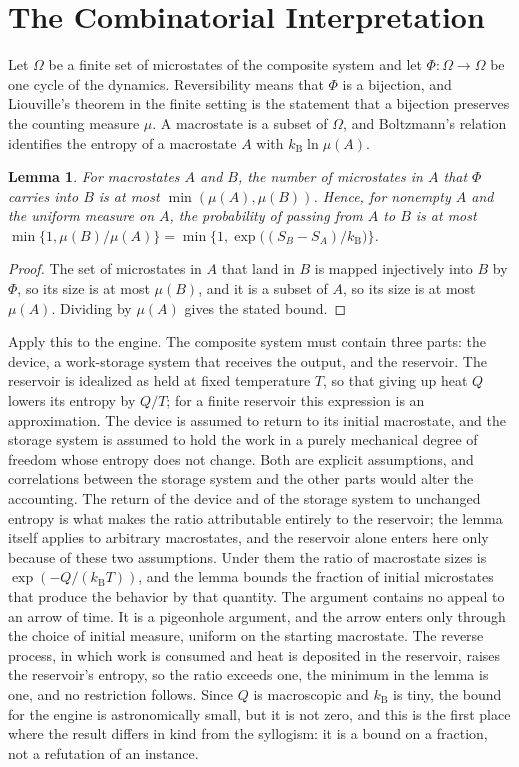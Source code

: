 \documentclass[11pt]{article}
\newtheorem{lemma}{Lemma}
\theoremstyle{definition}
\theoremstyle{remark}
\newcommand{\kB}{k_{\mathrm B}}
\begin{document}
\section{The Combinatorial Interpretation}\label{sec:comb}

Let $\Omega$ be a finite set of microstates of the composite system and let $\Phi : \Omega \to \Omega$ be one cycle of the dynamics. Reversibility means that $\Phi$ is a bijection, and Liouville's theorem in the finite setting is the statement that a bijection preserves the counting measure $\mu$. A macrostate is a subset of $\Omega$, and Boltzmann's relation \cite{boltzmann1877} identifies the entropy of a macrostate $A$ with $\kB \ln \mu(A)$.

\begin{lemma}\label{lem:count}
For macrostates $A$ and $B$, the number of microstates in $A$ that $\Phi$ carries into $B$ is at most $\min(\mu(A), \mu(B))$. Hence, for nonempty $A$ and the uniform measure on $A$, the probability of passing from $A$ to $B$ is at most $\min\{1, \mu(B)/\mu(A)\} = \min\{1, \exp\big((S_B - S_A)/\kB\big)\}$.
\end{lemma}

\begin{proof}
The set of microstates in $A$ that land in $B$ is mapped injectively into $B$ by $\Phi$, so its size is at most $\mu(B)$, and it is a subset of $A$, so its size is at most $\mu(A)$. Dividing by $\mu(A)$ gives the stated bound.
\end{proof}

Apply this to the engine. The composite system must contain three parts: the device, a work-storage system that receives the output, and the reservoir. The reservoir is idealized as held at fixed temperature $T$, so that giving up heat $Q$ lowers its entropy by $Q/T$; for a finite reservoir this expression is an approximation. The device is assumed to return to its initial macrostate, and the storage system is assumed to hold the work in a purely mechanical degree of freedom whose entropy does not change. Both are explicit assumptions, and correlations between the storage system and the other parts would alter the accounting. The return of the device and of the storage system to unchanged entropy is what makes the ratio attributable entirely to the reservoir; the lemma itself applies to arbitrary macrostates, and the reservoir alone enters here only because of these two assumptions. Under them the ratio of macrostate sizes is $\exp(-Q/(\kB T))$, and the lemma bounds the fraction of initial microstates that produce the behavior by that quantity. The argument contains no appeal to an arrow of time. It is a pigeonhole argument, and the arrow enters only through the choice of initial measure, uniform on the starting macrostate. The reverse process, in which work is consumed and heat is deposited in the reservoir, raises the reservoir's entropy, so the ratio exceeds one, the minimum in the lemma is one, and no restriction follows. Since $Q$ is macroscopic and $\kB$ is tiny, the bound for the engine is astronomically small, but it is not zero, and this is the first place where the result differs in kind from the syllogism: it is a bound on a fraction, not a refutation of an instance.
\end{document}

